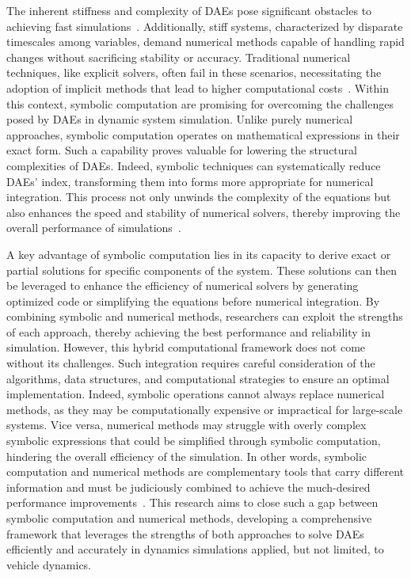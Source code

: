 The inherent stiffness and complexity of \acp{DAE} pose significant obstacles to achieving fast simulations~\cite{burger2018dae, blundell2004multibody, dejalon1994kinematic}. Additionally, stiff systems, characterized by disparate timescales among variables, demand numerical methods capable of handling rapid changes without sacrificing stability or accuracy. Traditional numerical techniques, like explicit solvers, often fail in these scenarios, necessitating the adoption of implicit methods that lead to higher computational costs~\cite{petzold1982differential, brenan1995numerical}. Within this context, symbolic computation are promising for overcoming the challenges posed by \acp{DAE} in dynamic system simulation. Unlike purely numerical approaches, symbolic computation operates on mathematical expressions in their exact form. Such a capability proves valuable for lowering the structural complexities of \acp{DAE}. Indeed, symbolic techniques can systematically reduce \acp{DAE}' index, transforming them into forms more appropriate for numerical integration. This process not only unwinds the complexity of the equations but also enhances the speed and stability of numerical solvers, thereby improving the overall performance of simulations~\cite{petzold1982differential, brenan1995numerical, griepentrog1986differential}.

A key advantage of symbolic computation lies in its capacity to derive exact or partial solutions for specific components of the system. These solutions can then be leveraged to enhance the efficiency of numerical solvers by generating optimized code or simplifying the equations before numerical integration. By combining symbolic and numerical methods, researchers can exploit the strengths of each approach, thereby achieving the best performance and reliability in simulation. However, this hybrid computational framework does not come without its challenges. Such integration requires careful consideration of the algorithms, data structures, and computational strategies to ensure an optimal implementation. Indeed, symbolic operations cannot always replace numerical methods, as they may be computationally expensive or impractical for large-scale systems. Vice versa, numerical methods may struggle with overly complex symbolic expressions that could be simplified through symbolic computation, hindering the overall efficiency of the simulation. In other words, symbolic computation and numerical methods are complementary tools that carry different information and must be judiciously combined to achieve the much-desired performance improvements~\cite{cohen2002computer, cohen2003computer}. This research aims to close such a gap between symbolic computation and numerical methods, developing a comprehensive framework that leverages the strengths of both approaches to solve \acp{DAE} efficiently and accurately in dynamics simulations applied, but not limited, to vehicle dynamics.


